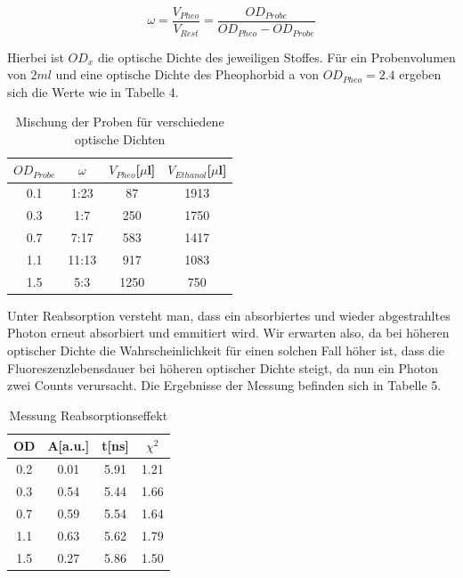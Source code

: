 \documentclass{article}
\begin{document}
\begin{equation}
  \omega = \frac{V_{Pheo}}{V_{Rest}}=\frac{OD_{Probe}}{OD_{Pheo}-OD_{Probe}}
\end{equation}



Hierbei ist $OD_x$ die optische Dichte des jeweiligen Stoffes. Für ein Probenvolumen von $2ml$ und eine
optische Dichte des Pheophorbid a von $OD_{Pheo}=2.4$ ergeben sich die Werte wie in Tabelle 4.

\begin{table}[h]
  \centering
  \begin{tabular}{c|c|c|c}
    $OD_{Probe}$ & $\omega$ & $V_{Pheo}$[$\mu$l] & $V_{Ethanol}$[$\mu$l] \\
    \hline
    0.1          &  1:23  & 87                & 1913 \\
    0.3          &  1:7   & 250               & 1750 \\
    0.7          &  7:17  & 583               & 1417 \\
    1.1          &  11:13 & 917               & 1083 \\
    1.5          &  5:3   & 1250              & 750  \\
  \end{tabular}
  \caption{Mischung der Proben für verschiedene optische Dichten}
\end{table}



Unter Reabsorption versteht man, dass ein absorbiertes und wieder abgestrahltes Photon erneut absorbiert und emmitiert wird.
Wir erwarten also, da bei höheren optischer Dichte die Wahrscheinlichkeit für einen solchen Fall höher ist, dass die Fluoreszenzlebensdauer
bei höheren optischer Dichte steigt, da nun ein Photon zwei Counts verursacht. Die Ergebnisse der Messung befinden sich in Tabelle 5.


\begin{table}[h]
  \centering
  \begin{tabular}{c|c|c|c}
    OD           & A[a.u.]& t[ns]             & $\chi^2$\\
    \hline
    0.2          &  0.01  & 5.91              & 1.21  \\
    0.3          &  0.54  & 5.44              & 1.66  \\
    0.7          &  0.59  & 5.54              & 1.64  \\
    1.1          &  0.63  & 5.62              & 1.79  \\
    1.5          &  0.27  & 5.86              & 1.50   \\
  \end{tabular}
  \caption{Messung Reabsorptionseffekt}
\end{table}
\end{document}
